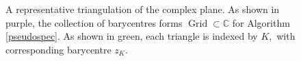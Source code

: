 \begin{figure}[H]
\caption[A Representative Triangulation of the Complex Plane]{A representative triangulation of the complex plane. As shown in purple, the collection of barycentres forms $\operatorname{Grid} \subset \mathbb{C}$ for Algorithm \ref{pseudospec}. As shown in green, each triangle is indexed by $K,$ with corresponding barycentre $z_K.$}
\label{Triang}
\end{figure} 



